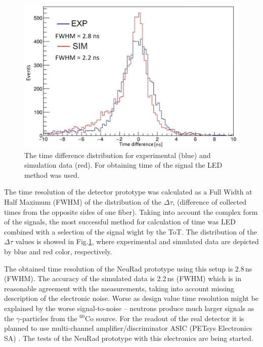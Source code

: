 \documentclass{webofc}
\begin{document}
\begin{figure}
	\centering
	\includegraphics[width=0.54\linewidth]{tausim.png}
	\caption{The time difference distribution for experimental (blue) and simulation data (red). For obtaining time of the signal the LED method was used.}\label{ris:tausim}
\end{figure}
	
The time resolution of the detector prototype was calculated as a Full Width at Half Maximum (FWHM) of the distribution of the $\Delta \tau$, (difference of collected times from the opposite sides of one fiber).
%
%
Taking into account the complex form of the signals, the most successful method for calculation of time was LED combined with a selection of the signal wight by the ToT.
The distribution of the $\Delta \tau$ values is showed in Fig.\ref{ris:tausim}, where experimental and simulated data are depicted by blue and red color, respectively.

The obtained time resolution of the NeuRad prototype using this setup is 2.8\,ns (FWHM). The accuracy of the simulated data is 2.2\,ns (FWHM) which is in reasonable agreement with the measurements, taking into account missing description of the electronic noise. Worse as design value time resolution might be explained by the worse signal-to-noise – neutrons produce much larger signals as the $\gamma$-particles from the $^{60}$Co source. For the readout of the real detector it is planned to use multi-channel amplifier/discriminator ASIC (PETsys Electronics SA) \cite{petsys}. The tests of the NeuRad prototype with this electronics are being started.

\end{document}
